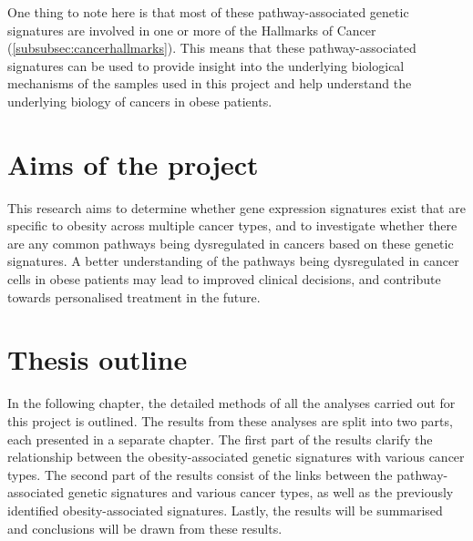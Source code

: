 One thing to note here is that most of these pathway-associated genetic signatures are involved in one or more of the Hallmarks of Cancer (\cref{subsubsec:cancerhallmarks}).
This means that these pathway-associated signatures can be used to provide insight into the underlying biological mechanisms of the samples used in this project and help understand the underlying biology of cancers in obese patients.

\vspace{-2mm}

\section{Aims of the project}
\label{sec:aim}

This research aims to determine whether gene expression signatures exist  that are specific to obesity across multiple cancer types, and to investigate whether there are any common pathways being dysregulated in cancers based on these genetic signatures.
A better understanding of the pathways being dysregulated in cancer cells in obese patients may lead to improved clinical decisions, and contribute towards personalised treatment in the future.

\section{Thesis outline}
\label{sec:thesis_outline}

In the following chapter, the detailed methods of all the analyses carried out for this project is outlined.
The results from these analyses are split into two parts, each presented in a separate chapter.
The first part of the results clarify the relationship between the obesity-associated genetic signatures with various cancer types.
The second part of the results consist of the links between the pathway-associated genetic signatures and various cancer types, as well as the previously identified obesity-associated signatures.
Lastly, the results will be summarised and conclusions will be drawn from these results.
